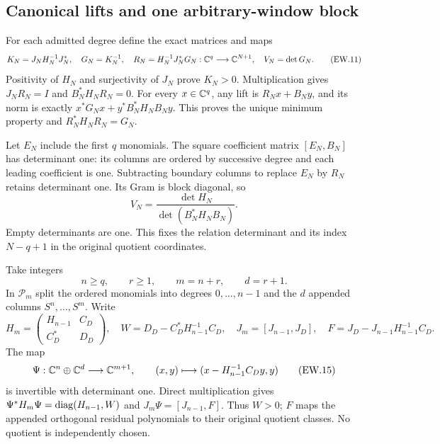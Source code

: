 \subsection{Canonical lifts and one arbitrary-window block}

For each admitted degree define the exact matrices and maps
\[
 K_N=J_NH_N^{-1}J_N^*,\quad G_N=K_N^{-1},\quad
 R_N=H_N^{-1}J_N^*G_N:\mathbb{C}^q\longrightarrow\mathbb{C}^{N+1},\quad
 V_N=\det G_N.                                               \tag{EW.11}
\]
Positivity of $H_N$ and surjectivity of $J_N$ prove $K_N>0$.
Multiplication gives $J_NR_N=I$ and $B_N^*H_NR_N=0$.
For every $x\in\mathbb{C}^q$, any lift is $R_Nx+B_Ny$, and its norm
is exactly $x^*G_Nx+y^*B_N^*H_NB_Ny$. This proves the unique
minimum property and $R_N^*H_NR_N=G_N$.

Let $E_N$ include the first $q$ monomials. The square coefficient
matrix $[E_N,B_N]$ has determinant one: its columns are ordered by
successive degree and each leading coefficient is one. Subtracting
boundary columns to replace $E_N$ by $R_N$ retains determinant
one. Its Gram is block diagonal, so
\[
 V_N=\frac{\det H_N}{\det(B_N^*H_NB_N)}.                    \tag{EW.12}
\]
Empty determinants are one. This fixes the relation determinant and
its index $N-q+1$ in the original quotient coordinates.

Take integers
\[
 n\ge q,\qquad r\ge1,\qquad m=n+r,\qquad d=r+1.
                                                               \tag{EW.13}
\]
In $\mathcal P_m$ split the ordered monomials into degrees
$0,\ldots,n-1$ and the $d$ appended columns $S^n,\ldots,S^m$.
Write
\[
 H_m=\begin{pmatrix}H_{n-1}&C_D\\C_D^*&D_D\end{pmatrix},\quad
 W=D_D-C_D^*H_{n-1}^{-1}C_D,\quad
 J_m=[J_{n-1},J_D],\quad F=J_D-J_{n-1}H_{n-1}^{-1}C_D.
                                                               \tag{EW.14}
\]
The map
\[
 \Psi:\mathbb{C}^n\oplus\mathbb{C}^d\longrightarrow\mathbb{C}^{m+1},\qquad
 (x,y)\longmapsto(x-H_{n-1}^{-1}C_Dy,y)                     \tag{EW.15}
\]
is invertible with determinant one. Direct multiplication gives
$\Psi^*H_m\Psi=\operatorname{diag}(H_{n-1},W)$ and
$J_m\Psi=[J_{n-1},F]$. Thus $W>0$; $F$ maps the appended
orthogonal residual polynomials to their original quotient classes.
No quotient is independently chosen.


